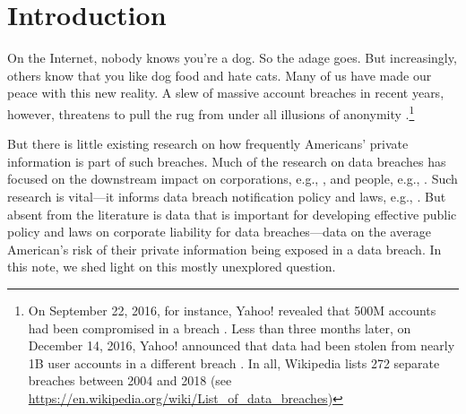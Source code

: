 \documentclass[sigconf]{acmart}
\begin{document}


%

%

%
\maketitle

\section{Introduction}
On the Internet, nobody knows you're a dog. So the adage goes. But increasingly, others know that you like dog food and hate cats. Many of us have made our peace with this new reality. A slew of massive account breaches in recent years, however, threatens to pull the rug from under all illusions of anonymity \cite{mccandless}.\footnote{On September 22, 2016, for instance, Yahoo! revealed that 500M accounts had been compromised in a breach \cite{fiegerman}. Less than three months later, on December 14, 2016, Yahoo! announced that data had been stolen from nearly 1B user accounts in a different breach \cite{newman}. In all, Wikipedia lists 272 separate breaches between 2004 and 2018 (see \href{https://en.wikipedia.org/wiki/List_of_data_breaches}{https://en.wikipedia.org/wiki/List\_of\_data\_breaches})}

But there is little existing research on how frequently Americans' private information is part of such breaches. Much of the research on data breaches has focused on the downstream impact on corporations, e.g., \cite{whitler2017impact, rosati2019social, janakiraman2018effect}, and people, e.g., \cite{cross2019media, mikhed2018data, curtis2018consumer}. Such research is vital---it informs data breach notification policy and laws, e.g., \cite{nieuwesteeg2018analysis, marcus2018data, kuhn2018147}. But absent from the literature is data that is important for developing effective public policy and laws on corporate liability for data breaches---data on the average American's risk of their private information being exposed in a data breach. In this note, we shed light on this mostly unexplored question. 
\end{document}
